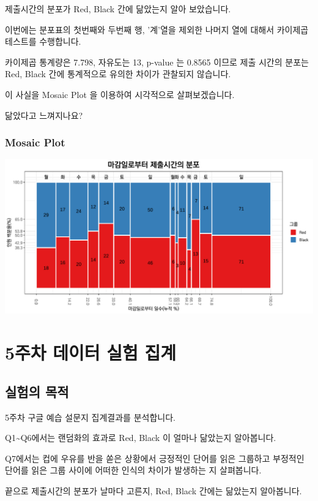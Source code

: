 \documentclass[
]{book}
\begin{document}
제출시간의 분포가 Red, Black 간에 닮았는지 알아 보았습니다.

이번에는 분포표의 첫번째와 두번째 행, '계'열을 제외한 나머지 열에 대해서 카이제곱테스트를 수행합니다.

카이제곱 통계량은 7.798, 자유도는 13, p-value 는 0.8565 이므로 제출 시간의 분포는 Red, Black 간에 통계적으로 유의한 차이가 관찰되지 않습니다.

이 사실을 Mosaic Plot 을 이용하여 시각적으로 살펴보겠습니다.

닮았다고 느껴지나요?

\subsection{Mosaic Plot}\label{mosaic-plot-7}

\includegraphics{Quiz_report_2025_files/figure-latex/unnamed-chunk-88-1.pdf}

\chapter{5주차 데이터 실험 집계}\label{uxc8fcuxcc28-uxb370uxc774uxd130-uxc2e4uxd5d8-uxc9d1uxacc4-4}

\section{실험의 목적}\label{uxc2e4uxd5d8uxc758-uxbaa9uxc801-4}

5주차 구글 예습 설문지 집계결과를 분석합니다.

Q1\textasciitilde Q6에서는 랜덤화의 효과로 Red, Black 이 얼마나 닮았는지 알아봅니다.

Q7에서는 컵에 우유를 반을 쏟은 상황에서 긍정적인 단어를 읽은 그룹하고 부정적인 단어를 읽은 그룹 사이에 어떠한 인식의 차이가 발생하는 지 살펴봅니다.

끝으로 제출시간의 분포가 날마다 고른지, Red, Black 간에는 닮았는지 알아봅니다.
\end{document}
